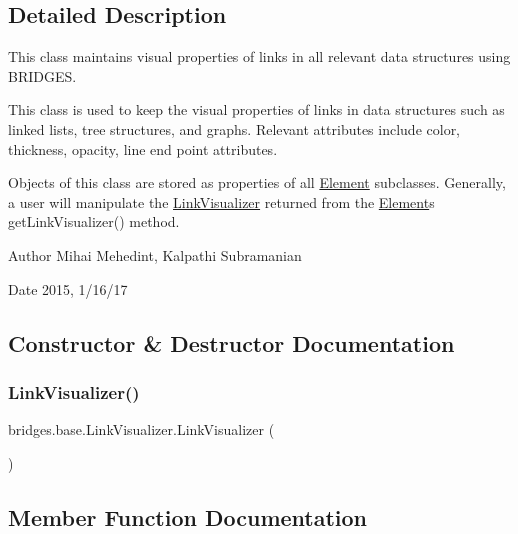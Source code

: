 \subsection{Detailed Description}
This class maintains visual properties of links in all relevant data structures using B\+R\+I\+D\+G\+ES. 

This class is used to keep the visual properties of links in data structures such as linked lists, tree structures, and graphs. Relevant attributes include color, thickness, opacity, line end point attributes.

Objects of this class are stored as properties of all \hyperlink{classbridges_1_1base_1_1_element}{Element} subclasses. Generally, a user will manipulate the \hyperlink{classbridges_1_1base_1_1_link_visualizer}{Link\+Visualizer} returned from the \hyperlink{classbridges_1_1base_1_1_element}{Element}\textquotesingle{}s get\+Link\+Visualizer() method.

\begin{DoxyAuthor}{Author}
Mihai Mehedint, Kalpathi Subramanian 
\end{DoxyAuthor}
\begin{DoxyDate}{Date}
2015, 1/16/17 
\end{DoxyDate}


\subsection{Constructor \& Destructor Documentation}
\hypertarget{classbridges_1_1base_1_1_link_visualizer_a0b69f099fa264ae9097b0efe278c6a1b}{}\label{classbridges_1_1base_1_1_link_visualizer_a0b69f099fa264ae9097b0efe278c6a1b} 
\subsubsection{\texorpdfstring{Link\+Visualizer()}{LinkVisualizer()}}
{\footnotesize\ttfamily bridges.\+base.\+Link\+Visualizer.\+Link\+Visualizer (\begin{DoxyParamCaption}{ }\end{DoxyParamCaption})}



\subsection{Member Function Documentation}
\hypertarget{classbridges_1_1base_1_1_link_visualizer_a3ed52d98ecab99c6d8dd136fba913b7d}{}\label{classbridges_1_1base_1_1_link_visualizer_a3ed52d98ecab99c6d8dd136fba913b7d} 
